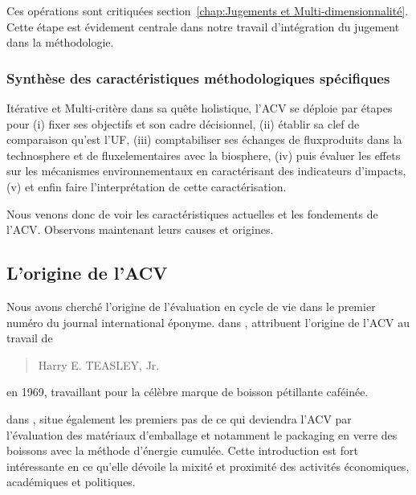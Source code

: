 Ces opérations sont critiquées section~\ref{chap:Jugements et Multi-dimensionnalité}.
Cette étape est évidement centrale dans notre travail d'intégration du jugement dans la méthodologie.


\subsubsection{Synthèse des caractéristiques méthodologiques spécifiques}
{Itérative} et {Multi-critère} dans sa quête holistique, l'\gls{ACV} se déploie par étapes pour
(i) fixer ses objectifs et son cadre décisionnel,
(ii) établir sa clef de comparaison qu'est l'\gls{UF},
(iii) comptabiliser ses échanges de \glspl{fluxproduit} dans la \gls{technosphere} et de \glspl{fluxelementaire} avec la \gls{biosphere},
(iv) puis évaluer les effets sur les mécanismes environnementaux en caractérisant des indicateurs d'impacts,
(v) et enfin faire l’interprétation de cette caractérisation.

Nous venons donc de voir les caractéristiques actuelles et les fondements de l'\gls{ACV}.
Observons maintenant leurs causes et origines.

\subsection{L'origine de l'ACV}
\label{subsec:L'origine de l'ACV}

Nous avons cherché l'origine de l'évaluation en cycle de vie dans le premier numéro du journal international éponyme.
\citeauthor{hunt_lca-_1996} dans , attribuent l'origine de l'ACV au travail de
\blockcquote{hunt_lca-_1996}{Harry E. TEASLEY, Jr.} en 1969, travaillant pour la célèbre marque de boisson pétillante caféinée.

\citeauthor{boustead_lca_1996} dans , situe également les premiers pas de ce qui deviendra l'ACV par l'évaluation des matériaux d'emballage et notamment le packaging en verre des boissons avec la méthode d'énergie cumulée.
Cette introduction est fort intéressante en ce qu'elle dévoile la mixité et proximité des activités économiques, académiques et politiques.

